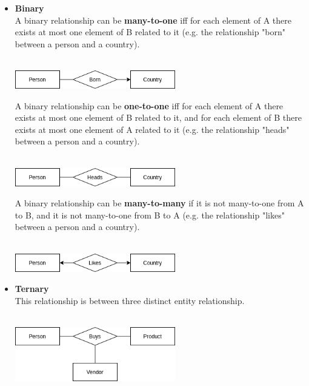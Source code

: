 \documentclass{article}
\begin{document}
\begin{itemize}
	\item \textbf{Binary}
	\vspace{.2cm} \\
	A binary relationship can be \textbf{many-to-one} iff for each element of A there exists at most one element of B related to it (e.g. the relationship "born" between a person and a country). \\ \\
	
	\centerline{\includegraphics[width=7cm]{./assets/many-to-one.png}}
	\vspace{.6cm}
	A binary relationship can be \textbf{one-to-one} iff for each element of A there exists at most one element of B related to it, and for each element of B there exists at most one element of A related to it (e.g. the relationship "heads" between a person and a country). \\ \\
	
	\centerline{\includegraphics[width=7cm]{./assets/one-to-one.png}}
	\vspace{.6cm}
	A binary relationship can be \textbf{many-to-many} if it is not many-to-one from A to B, and it is not many-to-one from B to A (e.g. the relationship "likes" between a person and a country). \\ \\
	
	\centerline{\includegraphics[width=7cm]{./assets/many-to-many.png}}
	\vspace{.6cm}
	
	\item \textbf{Ternary}
	\vspace{.2cm} \\
	This relationship is between three distinct entity relationship. \\ \\
	
	\centerline{\includegraphics[width=7cm]{./assets/ternary.png}}
	\vspace{.6cm}
	

\end{itemize}
\end{document}
